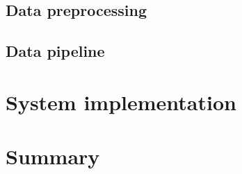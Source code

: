 \documentclass[thesis.tex]{subfiles}
\begin{document}
\subsection{Data preprocessing}

\subsection{Data pipeline}


\section{System implementation} \label{systemimplementation}


\section{Summary} \label{03summary}
\end{document}
